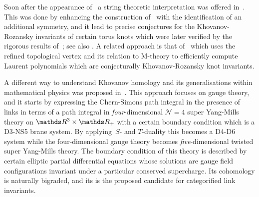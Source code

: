 \documentclass{compositio}
\theoremstyle{definition}
\numberwithin{equation}{section}
\begin{document}
Soon after the appearance of~\cite{kr0401268} a string theoretic interpretation was offered in~\cite{gsv0412243}. This was done by enhancing the construction of~\cite{ov9912123} with the identification of an additional symmetry, and it lead to precise conjectures for the Khovanov-Rozansky invariants of certain torus knots which were later verified by the rigorous results of~\cite{r0508510, r0607544}; see also \cite{dgr0505662, gw0512298}. A related approach is that of~\cite{as1105.5117} which uses the refined topological vertex and its relation to M-theory to efficiently compute Laurent polynomials which are conjecturally Khovanov-Rozansky knot invariants. 

A different way to understand Khovanov homology and its generalisations within mathematical physics was proposed in~\cite{w1101.3216}. This approach focuses on gauge theory, and it starts by expressing the Chern-Simons path integral in the presence of links in terms of a path integral in \emph{four}-dimensional $\mathcal N=4$ super Yang-Mills theory on $\nR^3\times\nR_{+}$ with a certain boundary condition which is a D3-NS5 brane system. By applying~$S$- and $T$-duality this becomes a D4-D6 system while the four-dimensional gauge theory becomes \emph{five}-dimensional twisted super Yang-Mills theory. The boundary condition of this theory is described by certain elliptic partial differential equations whose solutions are gauge field configurations invariant under a particular conserved supercharge. Its cohomology is naturally bigraded, and its is the proposed candidate for categorified link invariants. 

\medskip
\end{document}
